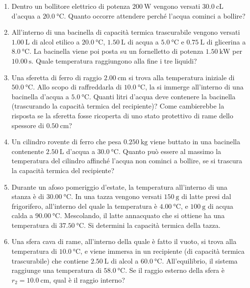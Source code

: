 \begin{enumerate}

    \item Dentro un bollitore elettrico di potenza $\SI{200}{\watt}$ vengono versati $\SI{30,0}{\centi\liter}$ d'acqua a $\SI{20,0}{\celsius}$. Quanto occorre attendere perché l'acqua cominci a bollire?
    
    \item All'interno di una bacinella di capacità termica trascurabile vengono versati $\SI{1,00}{\liter}$ di alcol etilico a $\SI{20,0}{\celsius}$, $\SI{1,50}{\liter}$ di acqua a $\SI{5,0}{\celsius}$ e $\SI{0,75}{\liter}$ di glicerina a $\SI{8,0}{\celsius}$. La bacinella viene poi posta su un fornelletto di potenza $\SI{1,50}{\kilo\watt}$ per $\SI{10,00}{\second}$. Quale temperatura raggiungono alla fine i tre liquidi?

    \item Una sferetta di ferro di raggio $\SI{2,00}{\cm}$ si trova alla temperatura iniziale di $\SI{50,0}{\celsius}$. Allo scopo di raffreddarla di $\SI{10,0}{\celsius}$, la si immerge all'interno di una bacinella d'acqua a $\SI{5,0}{\celsius}$. Quanti litri d'acqua deve contenere la bacinella (trascurando la capacità termica del recipiente)? Come cambierebbe la risposta se la sferetta fosse ricoperta di uno stato protettivo di rame dello spessore di $\SI{0,50}{\cm}$?
    
    \item Un cilindro rovente di ferro che pesa $\SI{0,250}{\kilogram}$ viene buttato in una bacinella contenente $\SI{2,50}{\liter}$ d'acqua a $\SI{30,0}{\celsius}$. Quanto può essere al massimo la temperatura del cilindro affinché l'acqua non cominci a bollire, se si trascura la capacità termica del recipiente?
    
    \item Durante un afoso pomeriggio d'estate, la temperatura all'interno di una stanza è di $\SI{30,00}{\celsius}$. In una tazza vengono versati $\SI{150}{\gram}$ di latte presi dal frigorifero, all'interno del quale la temperatura è $\SI{4,00}{\celsius}$, e $\SI{100}{\gram}$ di acqua calda a $\SI{90,00}{\celsius}$. Mescolando, il latte annacquato che si ottiene ha una temperatura di $\SI{37,50}{\celsius}$. Si determini la capacità termica della tazza.

    \item Una sfera cava di rame, all'interno della quale è fatto il vuoto, si trova alla temperatura di $\SI{10,0}{\celsius}$, e viene immersa in un recipiente (di capacità termica trascurabile) che contiene $\SI{2,50}{\liter}$ di alcol a $\SI{60,0}{\celsius}$. All'equilibrio, il sistema raggiunge una temperatura di $\SI{58,0}{\celsius}$. Se il raggio esterno della sfera è $r_2=\SI{10,0}{\cm}$, qual è il raggio interno?

\end{enumerate}
